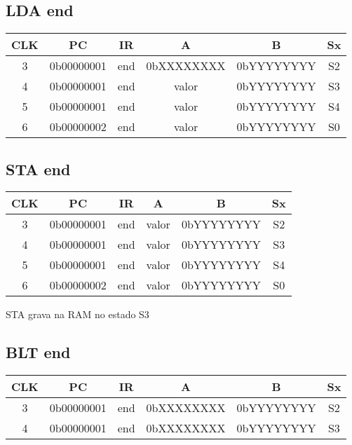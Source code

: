 \documentclass[../main.tex]{subfiles}
\begin{document}
\subsection{LDA end}

\begin{table}[H]
	\centering
	\begin{tabular}{|c|c|c|c|c|c|} %
	\hline
	CLK & PC & IR & A& B & Sx \\\hline
	3 & 0b00000001 & end & 0bXXXXXXXX & 0bYYYYYYYY & S2 \\\hline 
	4 & 0b00000001 & end & valor & 0bYYYYYYYY & S3 \\\hline
	5 & 0b00000001 & end & valor & 0bYYYYYYYY & S4 \\\hline
	6 & 0b00000002 & end & valor & 0bYYYYYYYY & S0 \\\hline	
	\end{tabular}
\end{table}


\subsection{STA end}

\begin{table}[H]
	\centering
	\begin{tabular}{|c|c|c|c|c|c|} %
	\hline
	CLK & PC & IR & A& B & Sx \\\hline
	3 & 0b00000001 & end & valor & 0bYYYYYYYY & S2 \\\hline 
	4 & 0b00000001 & end & valor & 0bYYYYYYYY & S3 \\\hline
	5 & 0b00000001 & end & valor & 0bYYYYYYYY & S4 \\\hline
	6 & 0b00000002 & end & valor & 0bYYYYYYYY & S0 \\\hline		
	\end{tabular}
\end{table}

STA grava na RAM no estado S3


\subsection{BLT end}

\begin{table}[H]
	\centering
	\begin{tabular}{|c|c|c|c|c|c|} %
	\hline
	CLK & PC & IR & A& B & Sx \\\hline
	3 & 0b00000001 & end & 0bXXXXXXXX & 0bYYYYYYYY & S2 \\\hline 
	4 & 0b00000001 & end & 0bXXXXXXXX & 0bYYYYYYYY & S3 \\\hline 	
	\end{tabular}	
\end{table}
\end{document}

